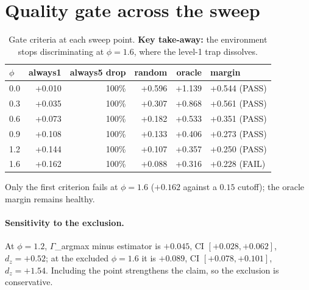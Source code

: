 \documentclass{article}
\begin{document}
\section{Quality gate across the sweep}
\label{app:gate}
\begin{table}[H]
  \caption{Gate criteria at each sweep point. \textbf{Key take-away:} the environment stops discriminating at $\phi{=}1.6$, where the level-1 trap dissolves.}
  \centering\small
  \begin{tabular}{lrrrrl}
    \toprule
    $\phi$ & always1 & always5 drop & random & oracle & margin \\
    \midrule
    0.0 & +0.010 & 100\% & +0.596 & +1.139 & +0.544 (PASS) \\
    0.3 & +0.035 & 100\% & +0.307 & +0.868 & +0.561 (PASS) \\
    0.6 & +0.073 & 100\% & +0.182 & +0.533 & +0.351 (PASS) \\
    0.9 & +0.108 & 100\% & +0.133 & +0.406 & +0.273 (PASS) \\
    1.2 & +0.144 & 100\% & +0.107 & +0.357 & +0.250 (PASS) \\
    1.6 & +0.162 & 100\% & +0.088 & +0.316 & +0.228 (FAIL) \\
    \bottomrule
  \end{tabular}
\end{table}
Only the first criterion fails at $\phi{=}1.6$ ($+0.162$ against a $0.15$ cutoff); the oracle margin remains healthy.

\paragraph{Sensitivity to the exclusion.} At $\phi{=}1.2$, $\Gamma$\_argmax minus estimator is $+0.045$, CI $[+0.028,+0.062]$, $d_z{=}{+}0.52$; at the excluded $\phi{=}1.6$ it is $+0.089$, CI $[+0.078,+0.101]$, $d_z{=}{+}1.54$. Including the point strengthens the claim, so the exclusion is conservative.
\end{document}

